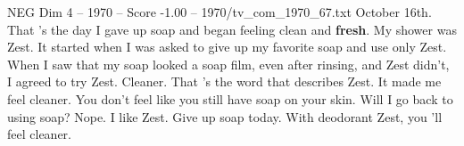 \begin{textsample}{NEG Dim 4 – 1970 – Score -1.00 – 1970/tv\_com\_1970\_67.txt}  \label{ex:f4_neg_055}
October 16th.
That 's the day I gave up soap and began feeling clean and \textbf{fresh}.
My shower was Zest.
It started when I was asked to give up my favorite soap and use only Zest.
When I saw that my soap looked a soap film, even after rinsing, and Zest didn't, I agreed to try Zest.
Cleaner.
That 's the word that describes Zest.
It made me feel cleaner.
You don't feel like you still have soap on your skin.
Will I go back to using soap?
Nope.
I like Zest.
Give up soap today.
With deodorant Zest, you 'll feel cleaner.

\end{textsample}
